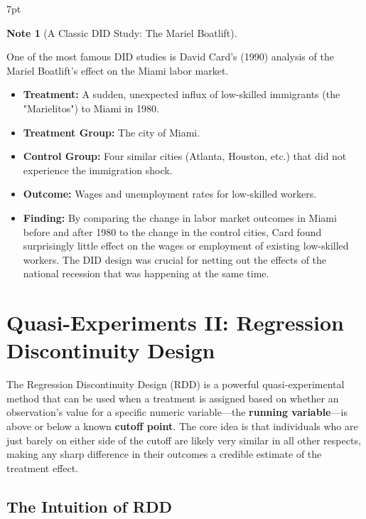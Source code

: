 \documentclass{article}
\newenvironment{blueblock}{
\def\FrameCommand{
  \hspace{1pt}
    {\color{DarkBlue}
    \vrule width 2pt}
    {\color{blueshade}
    \vrule width 4pt}
  \colorbox{blueshade}
}
\MakeFramed{
  \advance
  \hsize-
  \width
  \FrameRestore}
\noindent\hspace{-4.55pt}%
\begin{adjustwidth}{}{7pt}
\vspace{2pt}\vspace{2pt}
}
{\vspace{2pt}\end{adjustwidth}\endMakeFramed}
\newtheorem{note}{Note}
\begin{document}
\begin{blueblock}
\begin{note}[A Classic DID Study: The Mariel Boatlift]
\end{note}
One of the most famous DID studies is David Card's (1990) analysis of the Mariel Boatlift's effect on the Miami labor market.
\begin{itemize}
    \item \textbf{Treatment:} A sudden, unexpected influx of low-skilled immigrants (the "Marielitos") to Miami in 1980.
    \item \textbf{Treatment Group:} The city of Miami.
    \item \textbf{Control Group:} Four similar cities (Atlanta, Houston, etc.) that did not experience the immigration shock.
    \item \textbf{Outcome:} Wages and unemployment rates for low-skilled workers.
    \item \textbf{Finding:} By comparing the change in labor market outcomes in Miami before and after 1980 to the change in the control cities, Card found surprisingly little effect on the wages or employment of existing low-skilled workers. The DID design was crucial for netting out the effects of the national recession that was happening at the same time.
\end{itemize}
\end{blueblock}




\section{Quasi-Experiments II: Regression Discontinuity Design}
\label{sec:rdd}

The Regression Discontinuity Design (RDD) is a powerful quasi-experimental method that can be used when a treatment is assigned based on whether an observation's value for a specific numeric variable—the \textbf{running variable}—is above or below a known \textbf{cutoff point}. The core idea is that individuals who are just barely on either side of the cutoff are likely very similar in all other respects, making any sharp difference in their outcomes a credible estimate of the treatment effect.

\subsection{The Intuition of RDD}
\label{sub:rdd_intuition}
\end{document}
